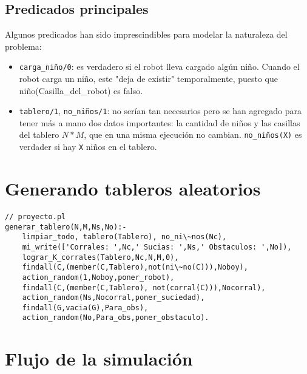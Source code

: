 \documentclass{llncs}
\begin{document}
\subsection{Predicados principales}

Algunos predicados han sido imprescindibles para modelar la naturaleza del problema:

\begin{itemize}
\item \texttt{carga\_ni\~no/0}: es verdadero si el robot lleva cargado alg\'un ni\~no. Cuando el robot carga un ni\~no, este "deja de existir" temporalmente, puesto que ni\~no(Casilla\_del\_robot) es falso.
\item \texttt{tablero/1}, \texttt{no\_ni\~nos/1}: no ser\'ian tan necesarios pero se han agregado para tener m\'as a mano dos datos  
importantes: la cantidad de ni\~nos y las casillas del tablero $N*M$, que en una misma ejecuci\'on no cambian. \texttt{no\_ni\~nos(X)} es verdader si hay \texttt{X} ni\~nos en el 
tablero. 
\end{itemize}


\section{Generando tableros aleatorios}

\begin{lstlisting}
// proyecto.pl
generar_tablero(N,M,Ns,No):-
    limpiar_todo, tablero(Tablero), no_ni\~nos(Nc),
    mi_write(['Corrales: ',Nc,' Sucias: ',Ns,' Obstaculos: ',No]),
    lograr_K_corrales(Tablero,Nc,N,M,0),
    findall(C,(member(C,Tablero),not(ni\~no(C))),Noboy),
    action_random(1,Noboy,poner_robot),
    findall(C,(member(C,Tablero), not(corral(C))),Nocorral), 
    action_random(Ns,Nocorral,poner_suciedad),
    findall(G,vacia(G),Para_obs), 
    action_random(No,Para_obs,poner_obstaculo).
\end{lstlisting}




\section{Flujo de la simulaci\'on}
\end{document}

